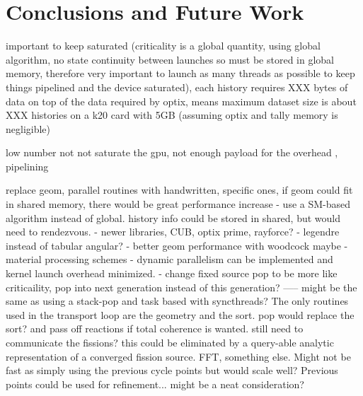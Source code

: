 \chapter{Conclusions and Future Work}
\label{chap:conclusions}

important to keep saturated (criticality is a global quantity, using global algorithm, no state continuity between launches so must be stored in global memory, therefore very important to launch as many threads as possible to keep things pipelined and the device saturated), each history requires XXX bytes of data on top of the data required by optix, means maximum dataset size is about XXX histories on a k20 card with 5GB (assuming optix and tally memory is negligible)

low number not not saturate the gpu, not enough payload for the overhead , pipelining

replace geom, parallel routines with handwritten, specific ones, if geom could fit in shared memory, there would be great performance increase
- use a SM-based algorithm instead of global.  history info could be stored in shared, but would need to rendezvous.
- newer libraries, CUB, optix prime, rayforce?
- legendre instead of tabular angular?
- better geom performance with woodcock maybe
- material processing schemes
- dynamic parallelism can be implemented and kernel launch overhead minimized.  
- change fixed source pop to be more like criticaility, pop into next generation instead of this generation?
-----  might be the same as using a stack-pop and task based with syncthreads?  The only routines used in the transport loop are the geometry and the sort.   pop would replace the sort?  and pass off reactions if total coherence is wanted.  still need to communicate the fissions?  this could be eliminated by a query-able analytic representation of a converged fission source.  FFT, something else.  Might not be fast as simply using the previous cycle points but would scale well?  Previous points could be used for refinement...  might be a neat consideration?